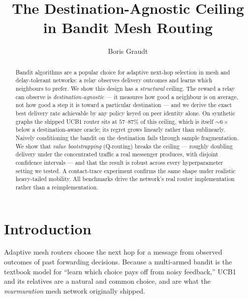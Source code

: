 \documentclass[sigconf,nonacm]{acmart}
\begin{document}
\title{The Destination-Agnostic Ceiling in Bandit Mesh Routing}

\author{Boris Graudt}
\affiliation{\institution{}\country{}}

\begin{abstract}
Bandit algorithms are a popular choice for adaptive next-hop selection in mesh
and delay-tolerant networks: a relay observes delivery outcomes and learns which
neighbours to prefer. We show this design has a \emph{structural} ceiling. The
reward a relay can observe is \emph{destination-agnostic} --- it measures how
good a neighbour is on average, not how good a step it is toward a particular
destination --- and we derive the exact best delivery rate achievable by any
policy keyed on peer identity alone. On synthetic graphs the shipped UCB1 router
sits at $57$--$87\%$ of this ceiling, which is itself $\sim$$6\times$ below a
destination-aware oracle; its regret grows linearly rather than sublinearly.
Naively conditioning the bandit on the destination fails through sample
fragmentation. We show that \emph{value bootstrapping} (Q-routing) breaks the
ceiling --- roughly doubling delivery under the concentrated traffic a real
messenger produces, with disjoint confidence intervals --- and that the result is
robust across every hyperparameter setting we tested. A contact-trace experiment
confirms the same shape under realistic heavy-tailed mobility. All benchmarks
drive the network's real router implementation rather than a reimplementation.
\end{abstract}

\maketitle

\section{Introduction}
Adaptive mesh routers choose the next hop for a message from observed outcomes of
past forwarding decisions. Because a multi-armed bandit is the textbook model for
``learn which choice pays off from noisy feedback,'' UCB1~\cite{auer2002} and its
relatives are a natural and common choice, and are what the \emph{murmuration}
mesh network originally shipped.
\end{document}

